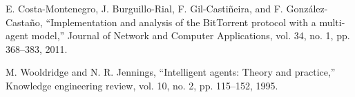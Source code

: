 \documentclass{article}
\begin{document}
\renewcommand*{\refname}{\section{منابع}}
\begin{thebibliography}{9}
\begin{latin}

E. Costa-Montenegro, J. Burguillo-Rial, F. Gil-Castiñeira, and F. González-Castaño, “Implementation and analysis of the BitTorrent protocol with a multi-agent model,” Journal of Network and Computer Applications, vol. 34, no. 1, pp. 368–383, 2011.

M. Wooldridge and N. R. Jennings, “Intelligent agents: Theory and practice,” Knowledge engineering review, vol. 10, no. 2, pp. 115–152, 1995.

\end{latin}
\end{thebibliography}
\end{document}
